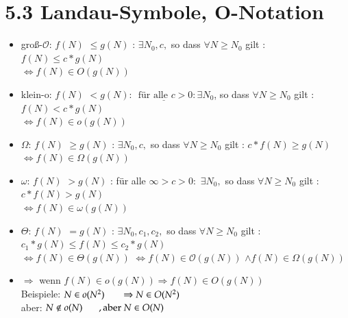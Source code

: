 \documentclass[11pt, fleqn]{scrreprt}
\begin{document}
\section*{5.3 Landau-Symbole, O-Notation}
\begin{itemize}[label={}]
	\item groß-$\mathcal{O}$: \hspace*{5mm}$f(N)$ \glqq $\leq$\grqq $g(N)$ : $\exists N_0, c, $ so dass $\forall N \geq N_0$ gilt : $f(N) \leq c * g(N)$\\
	\hspace*{4.5cm}$\Leftrightarrow f(N) \in O(g(N))$ 
	
	\item klein-o:  \hspace*{5mm}$f(N)$ \glqq $<$\grqq $g(N) $: $\underline{\text{ für alle } c>0} : \exists N_0 $, so dass $\forall N \geq N_0$ gilt : $f(N) < c * g(N)$\\
	\hspace*{4.5cm}$\Leftrightarrow f(N) \in o(g(N))$ 
	
	\item $\Omega$:  \hspace*{5mm}$f(N)$ \glqq $\geq$\grqq $g(N)$ : $\exists N_0, c, $ so dass $\forall N \geq N_0$ gilt : $c *f(N) \geq  g(N)$\\
	\hspace*{4.5cm}$\Leftrightarrow f(N) \in \Omega (g(N))$ 
	
	\item $\omega$:  \hspace*{5mm}$f(N)$ \glqq $>$\grqq $g(N)$ : für alle $\infty > c > 0:$ $\exists N_0, $ so dass $\forall N \geq N_0$ gilt : $c* f(N) > g(N)$\\
	\hspace*{4.5cm}$\Leftrightarrow f(N) \in \omega (g(N))$ 
	
	\item $\Theta$:  \hspace*{5mm}$f(N)$ \glqq $=$\grqq $g(N)$ : $\exists N_0, c_1, c_2, $ so dass $\forall N \geq N_0$ gilt : $c_1 * g(N) \leq f(N) \leq c_2 * g(N) $\\
	\hspace*{4.5cm}$\Leftrightarrow f(N) \in \Theta (g(N))$ $\Leftrightarrow f(N) \in \mathcal{O} (g(N))$ $\land f(N) \in \Omega (g(N))$ 
	
	\item $\Rightarrow$ wenn  $f(N) \in o(g(N)) \Rightarrow f(N) \in O(g(N))$ \\
	Beispiele: $N \in o(N^2) \hspace*{0.6cm} \Rightarrow N \in O(N^2)$ \\
	\hspace*{0.65cm} aber: $N \not\in o(N) \hspace*{0.6cm} , \text{aber }N \in O(N)$\\
\end{itemize}
\end{document}
